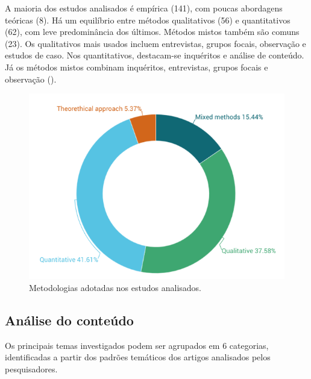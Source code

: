 \documentclass[portuguese]{textolivre}
\begin{document}
A maioria dos estudos analisados é empírica (141), com poucas abordagens teóricas (8). Há um equilíbrio entre métodos qualitativos (56) e quantitativos (62), com leve predominância dos últimos. Métodos mistos também são comuns (23). Os qualitativos mais usados incluem entrevistas, grupos focais, observação e estudos de caso. Nos quantitativos, destacam-se inquéritos e análise de conteúdo. Já os métodos mistos combinam inquéritos, entrevistas, grupos focais e observação ().

\begin{figure}[htbp]
\centering
\begin{minipage}{0.70\textwidth}
\includegraphics[width =\textwidth]{Imagens/Fig4.png}
\caption{Metodologias adotadas nos estudos analisados.}
\label{fig-4}
\end{minipage}
\end{figure}

\subsection{Análise do conteúdo}

Os principais temas investigados podem ser agrupados em 6 categorias, identificadas a partir dos padrões temáticos dos artigos analisados pelos pesquisadores.
\end{document}
